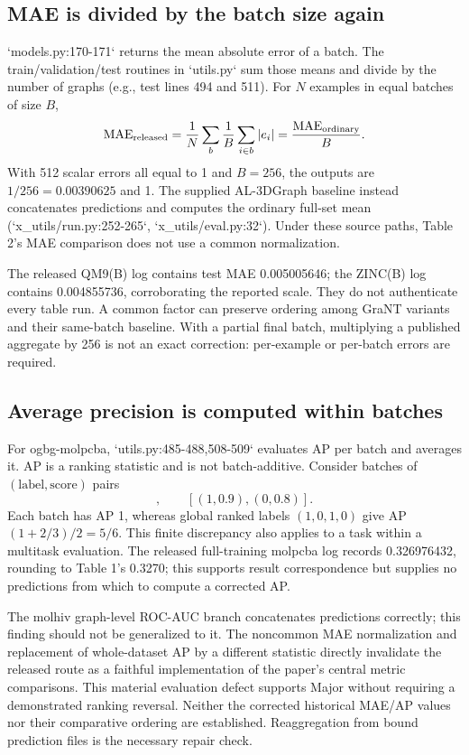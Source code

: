 \documentclass[10pt]{article}
\begin{document}
\subsection*{MAE is divided by the batch size again}
`models.py:170-171` returns the mean absolute error of a batch. The train/validation/test routines in `utils.py` sum those means and divide by the number of graphs (e.g., test lines 494 and 511). For \(N\) examples in equal batches of size \(B\), \[\mathrm{MAE}_{\rm released}
 =\frac1N\sum_b\frac1B\sum_{i\in b}|e_i|
 =\frac{\mathrm{MAE}_{\rm ordinary}}{B}.\] With 512 scalar errors all equal to 1 and \(B=256\), the outputs are \(1/256=0.00390625\) and 1. The supplied AL-3DGraph baseline instead concatenates predictions and computes the ordinary full-set mean (`x\_utils/run.py:252-265`, `x\_utils/eval.py:32`). Under these source paths, Table 2’s MAE comparison does not use a common normalization.\par
The released QM9(B) log contains test MAE 0.005005646; the ZINC(B) log contains 0.004855736, corroborating the reported scale. They do not authenticate every table run. A common factor can preserve ordering among GraNT variants and their same-batch baseline. With a partial final batch, multiplying a published aggregate by 256 is not an exact correction: per-example or per-batch errors are required.\par
\subsection*{Average precision is computed within batches}
For ogbg-molpcba, `utils.py:485-488,508-509` evaluates AP per batch and averages it. AP is a ranking statistic and is not batch-additive. Consider batches of \((\text{label},\text{score})\) pairs \[,\qquad[(1,0.9),(0,0.8)].\] Each batch has AP 1, whereas global ranked labels \((1,0,1,0)\) give AP \((1+2/3)/2=5/6\). This finite discrepancy also applies to a task within a multitask evaluation. The released full-training molpcba log records 0.326976432, rounding to Table 1’s 0.3270; this supports result correspondence but supplies no predictions from which to compute a corrected AP.\par
The molhiv graph-level ROC-AUC branch concatenates predictions correctly; this finding should not be generalized to it. The noncommon MAE normalization and replacement of whole-dataset AP by a different statistic directly invalidate the released route as a faithful implementation of the paper’s central metric comparisons. This material evaluation defect supports Major without requiring a demonstrated ranking reversal. Neither the corrected historical MAE/AP values nor their comparative ordering are established. Reaggregation from bound prediction files is the necessary repair check.\par
\end{document}
